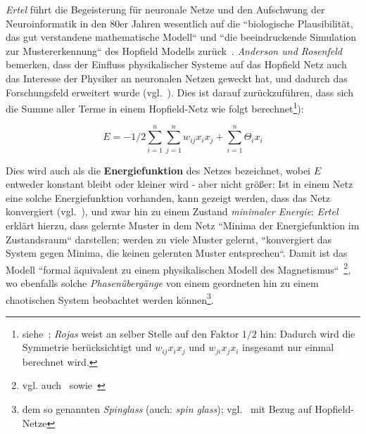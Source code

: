 \textit{Ertel} führt die Begeisterung für neuronale Netze und den Aufschwung der Neuroinformatik in den 80er Jahren wesentlich auf die ``biologische Plausibilität, das gut verstandene mathematische Modell`` und ``die beeindruckende Simulation zur Mustererkennung`` des Hopfield Modells zurück~\cite[297]{Ert21b}. \textit{Anderson und Rosenfeld} bemerken, dass der Einfluss physikalischer Systeme auf das Hopfield Netz auch das Interesse der Physiker an neuronalen Netzen geweckt hat, und dadurch das Forschungsfeld erweitert wurde (vgl.~\cite[458]{AR88}). Dies ist darauf zurückzuführen, dass sich die Summe aller Terme in einem Hopfield-Netz wie folgt berechnet\footnote{
    siehe~\cite[287]{Roj93}; \textit{Rojas} weist an selber Stelle auf den Faktor $1/2$ hin: Dadurch wird die  Symmetrie berücksichtigt und $w_{ij}x_ix_j$ und $w_{ji}x_jx_i$ insgesamt nur einmal berechnet wird.
}):

\begin{equation}
E = -1/2  \sum^n_{i=1}\sum^n_{j=1} w_{ij}x_ix_j + \sum^n_{i=1}\Theta_ix_i
\label{eq:gl-energie}
\end{equation}

Dies wird auch als die \textbf{Energiefunktion} des Netzes bezeichnet, wobei $E$ entweder konstant bleibt oder kleiner wird - aber nicht größer: Ist in einem Netz eine solche Energiefunktion vorhanden, kann gezeigt werden, dass das Netz konvergiert (vgl.~\cite[139]{Fau94}), und zwar hin zu einem Zustand \textit{minimaler Energie}: \textit{Ertel} erklärt hierzu, dass gelernte Muster in dem Netz ``Minima der Energiefunktion im Zustandsraum`` darstellen; werden zu viele Muster gelernt, ``konvergiert das System gegen Minima, die keinen gelernten Muster entsprechen``.
Damit ist das Modell ``formal äquivalent zu einem physikalischen Modell des Magnetismus``~\cite[293]{Ert21b}\footnote{
    vgl. auch~\cite[417]{AR98} sowie~\cite[2556 f.]{Hop82}
}, wo ebenfalls solche \textit{Phasenübergänge} von einem geordneten hin zu einem chaotischen System beobachtet werden können\footnote{
    dem so genannten \textit{Spinglass} (auch: \textit{spin glass}); vgl.~\cite[900]{BY86} mit Bezug auf Hopfield-Netze
}.\\

